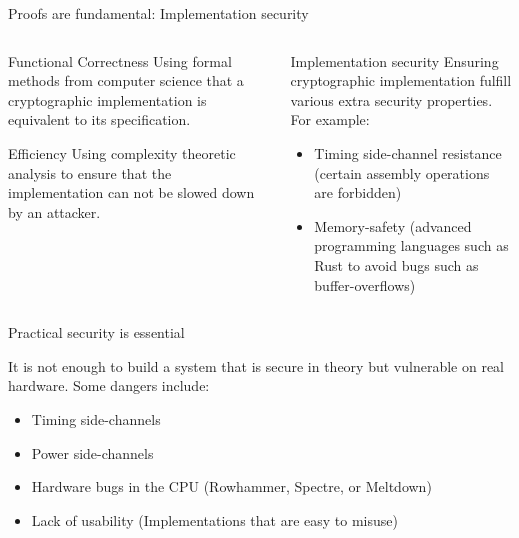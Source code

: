 \begin{frame}{Proofs are fundamental: Implementation security}
  \begin{columns}[t,fullwidth]

    \begin{column}{.40\textwidth}
      \begin{block}{Functional Correctness}
        Using formal methods from computer science that a cryptographic implementation is equivalent to its specification.
      \end{block}
      
      \vfill

      \begin{block}{Efficiency}
        Using complexity theoretic analysis to ensure that the implementation can not be slowed down by an attacker.
      \end{block}
    \end{column}

    \begin{column}{.55\textwidth}
      \begin{block}{Implementation security}
        Ensuring cryptographic implementation fulfill various extra security properties.
        For example:
        \vfill
        \begin{itemize}
          \item Timing side-channel resistance (certain assembly operations are forbidden)
          \item Memory-safety (advanced programming languages such as Rust to avoid bugs such as buffer-overflows)
        \end{itemize}
      \end{block}
    \end{column}
  \end{columns}

\end{frame}

\begin{frame}{Practical security is essential}
  \small

  It is not enough to build a system that is secure in theory but vulnerable on real hardware.
  Some dangers include:

  \begin{itemize}
    \item Timing side-channels
    \item Power side-channels
    \item Hardware bugs in the CPU (Rowhammer, Spectre, or Meltdown)
    \item Lack of usability (Implementations that are easy to misuse)
  \end{itemize}
\end{frame}

